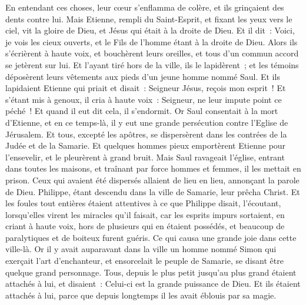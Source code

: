 \begin{multicols}{2}
En entendant ces choses, leur cœur s'enflamma de colère, et ils grinçaient des dents contre lui.
Mais Etienne, rempli du Saint-Esprit, et fixant les yeux vers le ciel, vit la gloire de Dieu, et Jésus qui était à la droite de Dieu.
Et il dit~: Voici, je vois les cieux ouverts, et le Fils de l'homme étant à la droite de Dieu.
Alors ils s'écrièrent à haute voix, et bouchèrent leurs oreilles, et tous d'un commun accord se jetèrent sur lui.
Et l'ayant tiré hors de la ville, ils le lapidèrent~; et les témoins déposèrent leurs vêtements aux pieds d'un jeune homme nommé Saul.
Et ils lapidaient Etienne qui priait et disait~: Seigneur Jésus, reçois mon esprit~!
Et s'étant mis à genoux, il cria à haute voix~: Seigneur, ne leur impute point ce péché~! Et quand il eut dit cela, il s'endormit.
\VerseOne{}Or Saul consentait à la mort d'Etienne, et en ce temps-là, il y eut une grande persécution contre l'Eglise de Jérusalem. Et tous, excepté les apôtres, se dispersèrent dans les contrées de la Judée et de la Samarie.
Et quelques hommes pieux emportèrent Etienne pour l'ensevelir, et le pleurèrent à grand bruit.
Mais Saul ravageait l'église, entrant dans toutes les maisons, et traînant par force hommes et femmes, il les mettait en prison.
Ceux qui avaient été dispersés allaient de lieu en lieu, annonçant la parole de Dieu.
Philippe, étant descendu dans la ville de Samarie, leur prêcha Christ.
Et les foules tout entières étaient attentives à ce que Philippe disait, l'écoutant, lorsqu'elles virent les miracles qu'il faisait,
car les esprits impurs sortaient, en criant à haute voix, hors de plusieurs qui en étaient possédés, et beaucoup de paralytiques et de boiteux furent guéris.
Ce qui causa une grande joie dans cette ville-là.
Or il y avait auparavant dans la ville un homme nommé Simon qui exerçait l'art d'enchanteur, et ensorcelait le peuple de Samarie, se disant être quelque grand personnage.
Tous, depuis le plus petit jusqu'au plus grand étaient attachés à lui, et disaient~: Celui-ci est la grande puissance de Dieu.
Et ils étaient attachés à lui, parce que depuis longtemps il les avait éblouis par sa magie.

\end{multicols}
